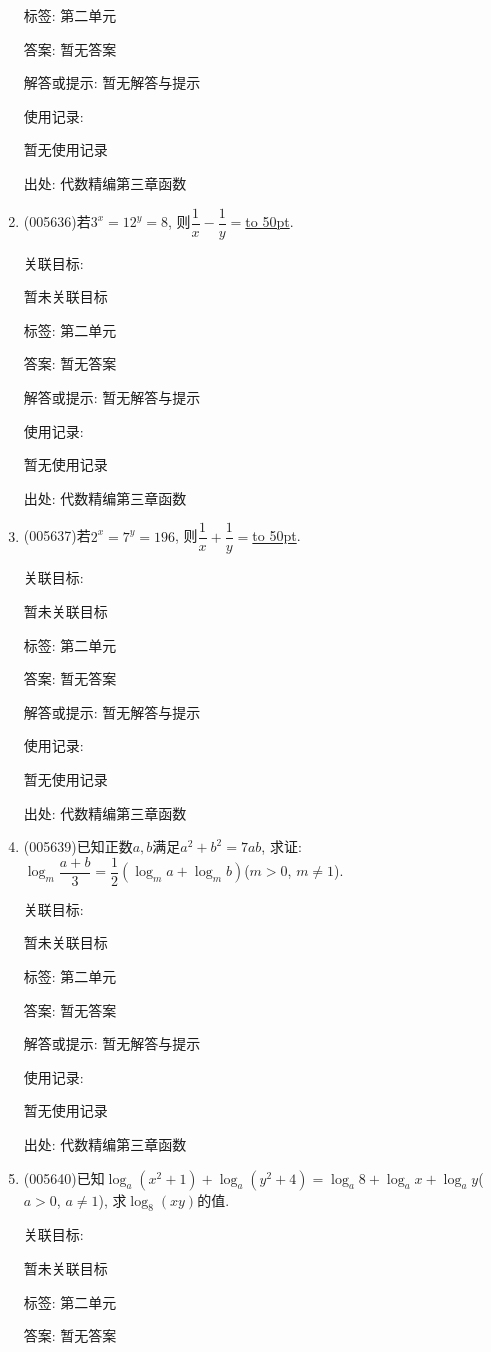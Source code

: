 \documentclass[10pt,a4paper]{article}
\newcommand{\blank}[1]{\underline{\hbox to #1pt{}}}
\begin{document}
\begin{enumerate}[1.]
标签: 第二单元

答案: 暂无答案

解答或提示: 暂无解答与提示

使用记录:

暂无使用记录


出处: 代数精编第三章函数
\item { (005636)}若$3^x=12^y=8$, 则$\dfrac 1x-\dfrac 1y=$\blank{50}.


关联目标:

暂未关联目标



标签: 第二单元

答案: 暂无答案

解答或提示: 暂无解答与提示

使用记录:

暂无使用记录


出处: 代数精编第三章函数
\item { (005637)}若$2^x=7^y=196$, 则$\dfrac 1x+\dfrac 1y=$\blank{50}.


关联目标:

暂未关联目标



标签: 第二单元

答案: 暂无答案

解答或提示: 暂无解答与提示

使用记录:

暂无使用记录


出处: 代数精编第三章函数
\item { (005639)}已知正数$a,b$满足$a^2+b^2=7ab$, 求证: $\log_m\dfrac{a+b}3=\dfrac 12(\log_ma+\log_mb)$($m>0$, $m\ne 1$).


关联目标:

暂未关联目标



标签: 第二单元

答案: 暂无答案

解答或提示: 暂无解答与提示

使用记录:

暂无使用记录


出处: 代数精编第三章函数
\item { (005640)}已知$\log_a(x^2+1)+\log_a(y^2+4)=\log_a8+\log_ax+\log_ay$($a>0$, $a\ne 1$), 求$\log_8(xy)$的值.


关联目标:

暂未关联目标



标签: 第二单元

答案: 暂无答案


\end{enumerate}
\end{document}
